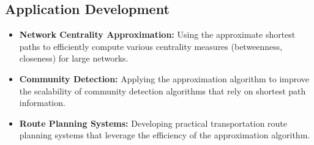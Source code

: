 \documentclass[a4paper,11pt,oneside]{book}
\begin{document}
\subsection{Application Development}
\begin{itemize}
    \item \textbf{Network Centrality Approximation:} Using the approximate shortest paths to efficiently compute various centrality measures (betweenness, closeness) for large networks.
    \item \textbf{Community Detection:} Applying the approximation algorithm to improve the scalability of community detection algorithms that rely on shortest path information.
    \item \textbf{Route Planning Systems:} Developing practical transportation route planning systems that leverage the efficiency of the approximation algorithm.
\end{itemize}
\end{document}
